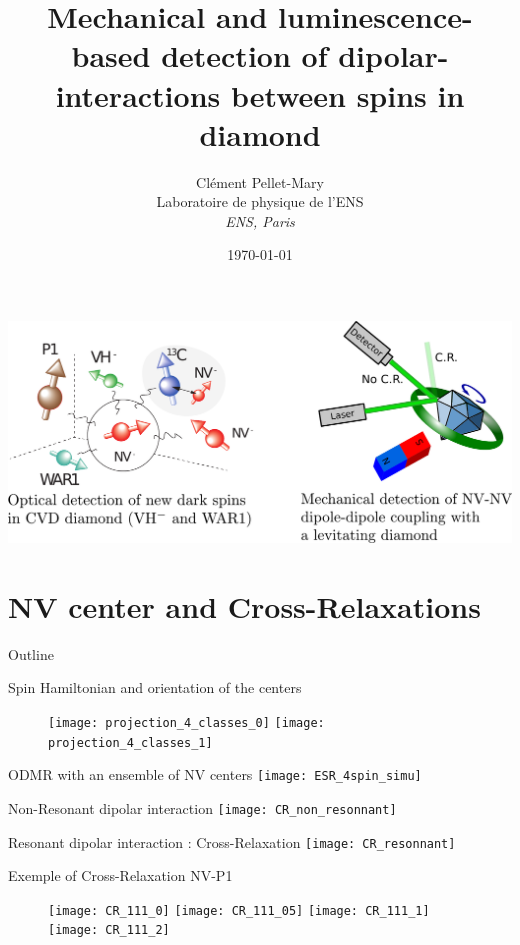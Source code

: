 \documentclass{beamer}
\title{Mechanical and luminescence-based detection of dipolar-interactions between spins in diamond}
\author{Clément Pellet-Mary\\ Laboratoire de physique de l'ENS\\ \textit{ENS, Paris}}
\date\today
\begin{document}
\begin{frame}
\maketitle
\end{frame}
\begin{frame}
\includegraphics[scale=.3]{Shémas_intro}
\end{frame}
\section{NV center and Cross-Relaxations}
\begin{frame}{Outline}
\tableofcontents[currentsection]
\end{frame}
\begin{frame}{Spin Hamiltonian and orientation of the centers}
\begin{figure}
    \begin{overprint}
    \texttt{[image: projection\_4\_classes\_0]}
    \texttt{[image: projection\_4\_classes\_1]}
    \end{overprint}
\end{figure}
\end{frame}
\begin{frame}{ODMR with an ensemble of NV centers}
\texttt{[image: ESR\_4spin\_simu]}
\end{frame}
\begin{frame}{Non-Resonant dipolar interaction}
\centering
\texttt{[image: CR\_non\_resonnant]}
\end{frame}
\begin{frame}{Resonant dipolar interaction : Cross-Relaxation}
\centering
\texttt{[image: CR\_resonnant]}
\end{frame}
\begin{frame}{Exemple of Cross-Relaxation NV-P1}
\begin{figure}
    \begin{overprint}
    \texttt{[image: CR\_111\_0]}
    \texttt{[image: CR\_111\_05]}
    \texttt{[image: CR\_111\_1]}
    \texttt{[image: CR\_111\_2]}
    \end{overprint}
\end{figure}
\end{frame}
\end{document}
